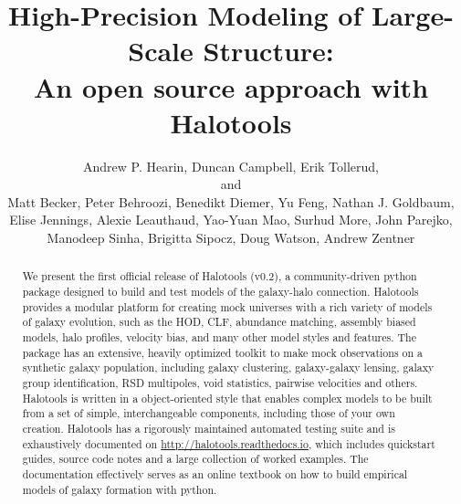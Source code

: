 \documentclass[twocolumn, tighten]{aastex6}
\begin{document}
\title{High-Precision Modeling of Large-Scale Structure: \\An open source approach with Halotools}

\author{Andrew P. Hearin, Duncan Campbell, Erik Tollerud,\\and\\
Matt Becker, Peter Behroozi, Benedikt Diemer, Yu Feng, 
Nathan J. Goldbaum, Elise Jennings, Alexie Leauthaud, Yao-Yuan Mao, 
Surhud More, John Parejko, Manodeep Sinha, Brigitta Sipocz, 
Doug Watson, Andrew Zentner 
}


\begin{abstract}

We  present the first official release of Halotools (v0.2), a community-driven python package designed to build and test models of the galaxy-halo connection. Halotools provides a modular platform for creating mock universes with a rich variety of models of galaxy evolution, such as the HOD, CLF, abundance matching, assembly biased models, halo profiles, velocity bias, and many other model styles and features. The package has an extensive, heavily optimized toolkit to make mock observations on a synthetic galaxy population, including galaxy clustering, galaxy-galaxy lensing, galaxy group identification, RSD multipoles, void statistics, pairwise velocities and others. Halotools is written in a object-oriented style that enables complex models to be built from a set of simple, interchangeable components, including those of your own creation. Halotools has a rigorously maintained automated testing suite and is exhaustively documented on \url{http://halotools.readthedocs.io}, which includes quickstart guides, source code notes and a large collection of worked examples. The documentation effectively serves as an online textbook on how to build empirical models of galaxy formation with python. 
\end{abstract} 
\end{document}
